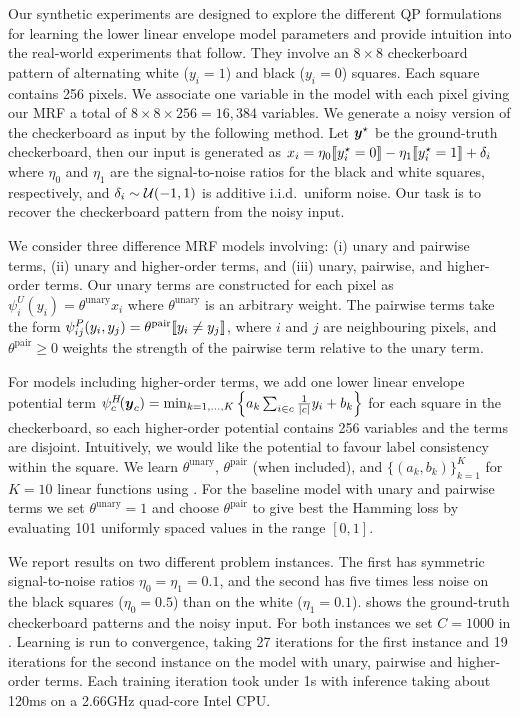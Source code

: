 \documentclass[10pt,journal,letterpaper,compsoc]{IEEEtran}
\begin{document}
Our synthetic experiments are designed to explore the different QP
formulations for learning the lower linear envelope model parameters
and provide intuition into the real-world experiments that
follow. They involve an $8 \times 8$ checkerboard pattern of
alternating white ($y_i = 1$) and black ($y_i = 0$) squares. Each
square contains 256 pixels. We associate one variable in the model
with each pixel giving our MRF a total of $8 \times 8 \times 256 =
16,384$ variables. We generate a noisy version of the checkerboard as
input by the following method. Let ${\boldsymbol{y}}^\star$ be the ground-truth
checkerboard, then our input is generated as $x_i = \eta_0
\ind{y^\star_i = 0} - \eta_1 \ind{y^\star_i = 1} + \delta_i$ where
$\eta_0$ and $\eta_1$ are the signal-to-noise ratios for the black and
white squares, respectively, and $\delta_i \sim \U(-1, 1)$ is additive
i.i.d.\ uniform noise. Our task is to recover the checkerboard pattern
from the noisy input.

We consider three difference MRF models involving: (i) unary and
pairwise terms, (ii) unary and higher-order terms, and (iii) unary,
pairwise, and higher-order terms. Our unary terms are constructed for
each pixel as $\psi^U_i\!(y_i) = \theta^\textrm{unary} x_i$ where
$\theta^\textrm{unary}$ is an arbitrary weight. The pairwise terms
take the form $\psi^P_{ij}(y_i, y_j) = \theta^\textrm{pair} \ind{y_i
  \neq y_j}$, where $i$ and $j$ are neighbouring pixels, and
$\theta^{\textrm{pair}} \geq 0$ weights the strength of the pairwise
term relative to the unary term.

For models including higher-order terms, we add one lower linear
envelope potential term $\psi^H_c\!({\boldsymbol{y}}_c) = \min_{k=1, \ldots, K}
\left\{ a_k \sum_{i \in c} \frac{1}{|c|} y_i + b_k \right\}$ for each
square in the checkerboard, so each higher-order potential contains
256 variables and the terms are disjoint. Intuitively, we would like
the potential to favour label consistency within the square. We learn
$\theta^{\textrm{unary}}$, $\theta^{\textrm{pair}}$ (when included),
and $\{(a_k, b_k)\}_{k=1}^{K}$ for $K=10$ linear functions using
. For the baseline model with unary and pairwise
terms we set $\theta^\textrm{unary} = 1$ and choose
$\theta^\textrm{pair}$ to give best the Hamming loss by evaluating 101
uniformly spaced values in the range $[0, 1]$.

We report results on two different problem instances. The first has
symmetric signal-to-noise ratios $\eta_0 = \eta_1 = 0.1$, and the
second has five times less noise on the black squares ($\eta_0 = 0.5$)
than on the white ($\eta_1 = 0.1$). 
shows the ground-truth checkerboard patterns and the noisy input. For
both instances we set $C = 1000$ in . Learning
is run to convergence, taking 27 iterations for the first instance and
19 iterations for the second instance on the model with unary,
pairwise and higher-order terms. Each training iteration took under 1s
with inference taking about 120ms on a 2.66GHz quad-core Intel CPU.
\end{document}
